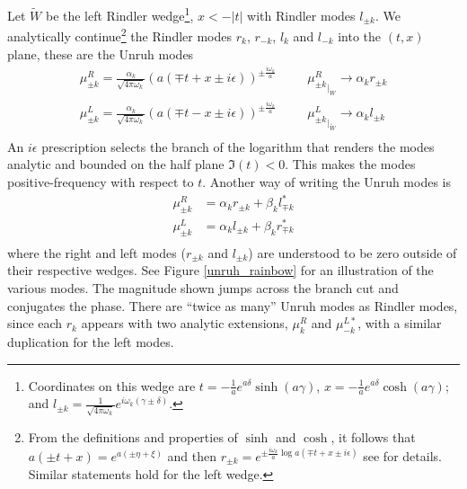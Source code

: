 \documentclass[12pt,a4paper]{article}
\begin{document}
Let $\widetilde{W}$ be the left Rindler wedge\footnote{Coordinates on this wedge are $t = -\frac{1}{a}e^{a\delta} \sinh(a\gamma)$, $x = -\frac{1}{a}e^{a\delta} \cosh(a\gamma)$; and $l_{\pm k} = \frac{1}{\sqrt{4 \pi \omega_k}} e^{i\omega_k(\gamma \pm \delta)}$.}, $x < -|t|$ with Rindler modes $l_{\pm k}$.  We analytically continue\footnote{From the definitions and properties of $\sinh$ and $\cosh$, it follows that $a(\pm t + x) = e^{a(\pm \eta + \xi)}$ and then $r_{\pm k} = e^{\pm \frac{i \omega_k}{a}\log a(\mp t + x \pm i\epsilon)}$ see \cite{frodden2018unruh} for details.  Similar statements hold for the left wedge.} the Rindler modes $r_k$, $r_{-k}$, $l_k$ and $l_{-k}$ into the $(t,x)$ plane, these are the Unruh modes
\begin{equation}
  \begin{array}{ll}
    \mu^R_{\pm k} = \frac{\alpha_k }{\sqrt{4 \pi \omega_k}} (a(\mp t + x \pm  i \epsilon))^{\pm \frac{i \omega_k}{a}} & \hspace{20pt}
       {\mu^R_{\pm k}}_{|_W} \rightarrow \alpha_k r_{\pm k} \\
    \mu^L_{\pm k} =  \frac{\alpha_k}{\sqrt{4 \pi \omega_k}} (a(\mp t - x \pm  i \epsilon))^{\pm \frac{i \omega_k}{a}} & \hspace{20pt}
    {\mu^L_{\pm k}}_{|_{\widetilde{W}}} \rightarrow \alpha_k l_{\pm k} \\
  \end{array}
  \label{rindler_mode_def}
\end{equation}
An $i \epsilon$ prescription selects the branch of the logarithm that renders the modes analytic and bounded on the half plane $\mathfrak{I}(t)<0$. This makes the modes positive-frequency with respect to $t$.  Another way of writing the Unruh modes is
\begin{equation}
\begin{aligned}
  \mu^R_{\pm k} &= \alpha_k r_{\pm k} + \beta_k l^*_{\mp k} \\
  \mu^L_{\pm k} &= \alpha_k l_{\pm k} + \beta_k r^*_{\mp k} \\
\end{aligned}
\label{unruh_mode_def}
\end{equation}
where the right and left modes ($r_{\pm k}$ and $l_{\pm k}$) are understood to be zero outside of their respective wedges. See Figure \ref{unruh_rainbow} for an illustration of the various modes. The magnitude shown jumps across the branch cut and conjugates the phase. There are ``twice as many'' Unruh modes as Rindler modes, since each $r_k$ appears with two analytic extensions, $\mu^R_k$ and $\mu^{L*}_{-k}$, with a similar duplication for the left modes.
\end{document}
